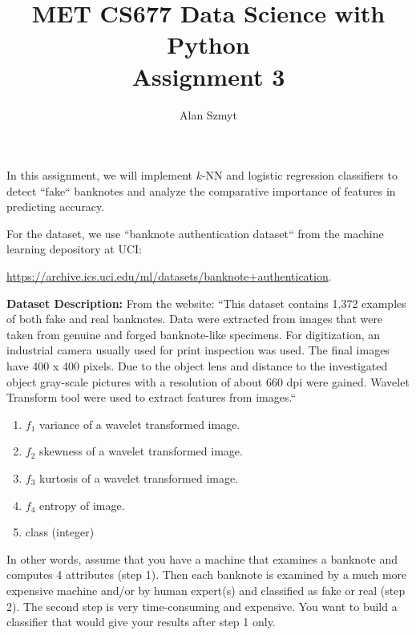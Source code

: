 \documentclass[12pt, a4paper]{extarticle}
\author{Alan Szmyt}
\title{MET CS677 Data Science with Python \\ Assignment 3 }
\newcommand{\knn}{\texorpdfstring{$k$-NN}}
\newcommand{\fixture}[1]{\texorpdfstring{\ensuremath{f_{#1}}}\xspace}
\begin{document}
    \nocite{*}
    
    \maketitle

    \thispagestyle{firstpage}

    \renewcommand{\UrlFont}{\bfseries}

    In this assignment, we will implement \knn{} and logistic regression classifiers to detect ``fake`` banknotes and analyze the comparative importance of features in predicting accuracy.

    For the dataset, we use ``banknote authentication dataset`` from the machine learning depository at UCI: \par
    \url{https://archive.ics.uci.edu/ml/datasets/banknote+authentication}.

    \textbf{Dataset Description: } From the website: ``This dataset contains 1,372 examples of both fake and real banknotes.
    Data were extracted from images that were taken from genuine and forged banknote-like specimens.
    For digitization, an industrial camera usually used for print inspection was used.
    The final images have 400 x 400 pixels.
    Due to the object lens and distance to the investigated object gray-scale pictures with a resolution of about 660 dpi were gained.
    Wavelet Transform tool were used to extract features from images.``

    \begin{enumerate}
        \item \fixture{1} - variance of a wavelet transformed image.
        \item \fixture{2} - skewness of a wavelet transformed image.
        \item \fixture{3} - kurtosis of a wavelet transformed image.
        \item \fixture{4} - entropy of image.
        \item class (integer)
    \end{enumerate}

    In other words, assume that you have a machine that examines a banknote and computes 4 attributes (step 1).
    Then each banknote is examined by a much more expensive machine and/or by human expert(s) and classified as fake or real (step 2).
    The second step is very time-consuming and expensive.
    You want to build a classifier that would give your results after step 1 only.
\end{document}
